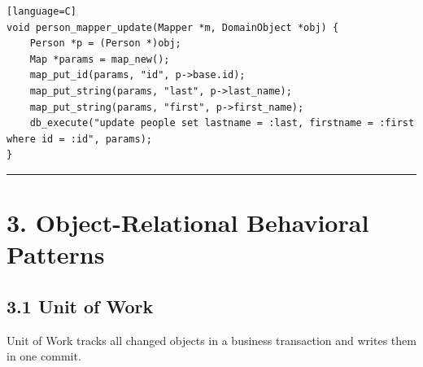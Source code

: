 \documentclass[11pt]{article}
\begin{document}
\begin{verbatim}[language=C]
void person_mapper_update(Mapper *m, DomainObject *obj) {
    Person *p = (Person *)obj;
    Map *params = map_new();
    map_put_id(params, "id", p->base.id);
    map_put_string(params, "last", p->last_name);
    map_put_string(params, "first", p->first_name);
    db_execute("update people set lastname = :last, firstname = :first where id = :id", params);
}
\end{verbatim}

\begin{center}\rule{0.5\linewidth}{0.5pt}\end{center}

\section{3. Object-Relational Behavioral
Patterns}\label{object-relational-behavioral-patterns}

\subsection{3.1 Unit of Work}\label{unit-of-work}

Unit of Work tracks all changed objects in a business transaction and
writes them in one commit.
\end{document}

